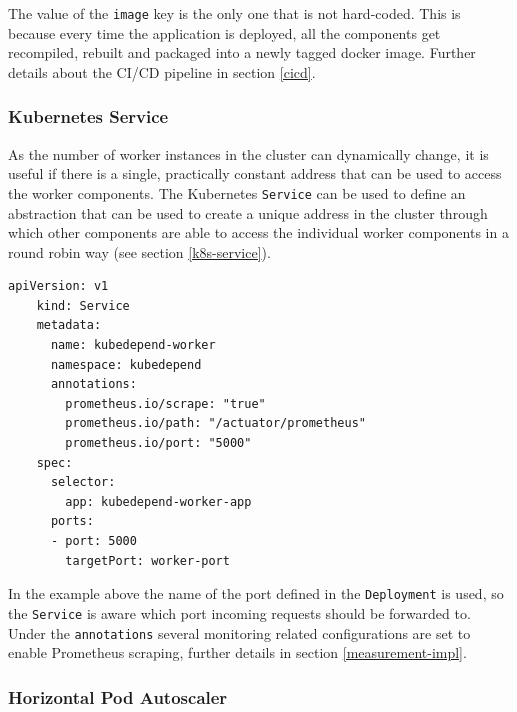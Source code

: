The value of the \texttt{image} key is the only one that is not hard-coded. This is because every time the application is deployed, all the components get recompiled, rebuilt and packaged into a newly tagged docker image. Further details about the CI/CD pipeline in section \ref{cicd}.

\subsubsection{Kubernetes Service}

As the number of worker instances in the cluster can dynamically change, it is useful if there is a single, practically constant address that can be used to access the worker components. The Kubernetes \texttt{Service} can be used to define an abstraction that can be used to create a unique address in the cluster through which other components are able to access the individual worker components in a round robin way (see section \ref{k8s-service}).

\begin{minipage}{\linewidth}
	\begin{lstlisting}[caption={Worker \texttt{Service}}]
	apiVersion: v1
	kind: Service
	metadata:
	  name: kubedepend-worker
	  namespace: kubedepend
	  annotations:
	    prometheus.io/scrape: "true"
	    prometheus.io/path: "/actuator/prometheus"
	    prometheus.io/port: "5000"
	spec:
	  selector:
	    app: kubedepend-worker-app
	  ports:
	  - port: 5000
	    targetPort: worker-port
	\end{lstlisting}
\end{minipage}

In the example above the name of the port defined in the \texttt{Deployment} is used, so the \texttt{Service} is aware which port incoming requests should be forwarded to. Under the \texttt{annotations} several monitoring related configurations are set to enable Prometheus scraping, further details in section \ref{measurement-impl}.


\subsubsection{Horizontal Pod Autoscaler}

